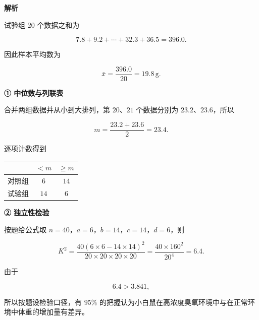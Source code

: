 \begin{answer}
\textbf{解析}


试验组 $20$ 个数据之和为

\nopagebreak[4]
\[
7.8+9.2+\cdots+32.3+36.5=396.0.
\]

因此样本平均数为

\nopagebreak[4]
\[
\bar x=\frac{396.0}{20}=19.8\,\mathrm g.
\]


\textbf{① 中位数与列联表}

合并两组数据并从小到大排列，第 $20$、$21$ 个数据分别为 $23.2$、$23.6$，所以

\nopagebreak[4]
\[
m=\frac{23.2+23.6}{2}=23.4.
\]

逐项计数得到

\begin{center}
\begin{tabular}{ccc}
\toprule
 & $<m$ & $\geqslant m$ \\
\midrule
对照组 & $6$ & $14$ \\
试验组 & $14$ & $6$ \\
\bottomrule
\end{tabular}
\end{center}

\textbf{② 独立性检验}

按题给公式取 $n=40$，$a=6$，$b=14$，$c=14$，$d=6$，则

\nopagebreak[4]
\[
K^2
=\frac{40(6\times6-14\times14)^2}{20\times20\times20\times20}
=\frac{40\times160^2}{20^4}
=6.4.
\]

由于

\nopagebreak[4]
\[
6.4>3.841,
\]

所以按题设检验口径，有 $95\%$ 的把握认为小白鼠在高浓度臭氧环境中与在正常环境中体重的增加量有差异。



\end{answer}
